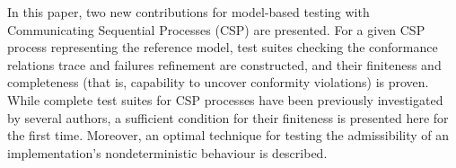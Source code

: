 In this paper, two new contributions for model-based testing with
Communicating Sequential Processes (CSP) are presented. For a given CSP
process representing the reference model, test suites checking the
conformance relations trace and failures refinement are constructed, and
their finiteness and completeness (that is, capability to uncover conformity
violations) is proven. While complete test suites for CSP processes have been
previously investigated by several authors, a sufficient condition for their
finiteness is presented here for the first time. Moreover, an optimal
technique for testing the admissibility of an implementation's
nondeterministic behaviour is described.
